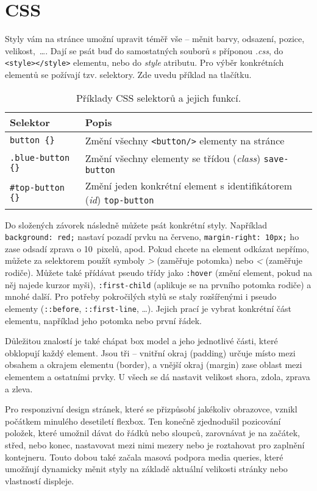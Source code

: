 \section{CSS}

Styly vám na stránce umožní upravit téměř vše – měnit barvy, odsazení, pozice,
\mbox{velikost},~\ldots. Dají se psát buď do samostatných souborů s příponou \textit{.css}, do \texttt{<style></style>} elementu, nebo do \textit{style} atributu. Pro výběr konkrétních elementů se požívají tzv. selektory. Zde uvedu příklad na tlačítku.

\begin{table}[h!]
\centering
\begin{tabular}{|>{\ttfamily}m{4cm}|m{8cm}|}
\hline
\textbf{Selektor} & \textbf{Popis} \\ \hline
\texttt{button \{\}} & Změní všechny \texttt{<button/>} elementy na stránce \\ \hline
\texttt{.blue-button \{\}} & Změní všechny elementy se třídou (\textit{class}) \texttt{save-button} \\ \hline
\texttt{\#top-button \{\}} & Změní jeden konkrétní element s identifikátorem (\textit{id}) \texttt{top-button} \\ \hline
\end{tabular}
\caption{Příklady CSS selektorů a jejich funkcí.}
\end{table}

Do složených závorek následně můžete psát konkrétní styly. Například \texttt{background:~red;} nastaví pozadí prvku na červeno, \texttt{margin-right:~10px;} ho zase odsadí zprava o 10~pixelů, apod. Pokud chcete na element odkázat nepřímo, můžete za selektorem použít symboly \textit{>} (zaměřuje potomka) nebo \textit{<} (zaměřuje rodiče). Můžete také přídávat pseudo třídy jako \texttt{:hover} (změní element, pokud na něj najede kurzor myši), \texttt{:first-child} (aplikuje se na prvního potomka rodiče) a mnohé další. Pro potřeby pokročilých stylů se staly rozšířenými i pseudo elementy (\texttt{::before}, \texttt{::first-line}, \ldots). Jejich prací je vybrat konkrétní část elementu, například jeho potomka nebo první řádek.

Důležitou znalostí je také chápat box model a jeho jednotlivé části, které obklopují každý element. Jsou tři – vnitřní okraj (padding) určuje místo mezi obsahem a okrajem elementu (border), a vnější okraj (margin) zase oblast mezi elementem a ostatními prvky. U všech se dá nastavit velikost shora, zdola, zprava a zleva.

Pro responzivní design stránek, které se přizpůsobí jakékoliv obrazovce, vznikl počátkem minulého desetiletí flexbox. Ten konečně zjednodušil pozicování položek, které umožnil dávat do řádků nebo sloupců, zarovnávat je na začátek, střed, nebo konec, nastavovat mezi nimi mezery nebo je roztahovat pro zaplnění kontejneru.\cite{CSSFlexbox} Touto dobou také začala masová podpora media queries, které umožňují dynamicky měnit styly na základě aktuální velikosti stránky nebo vlastností displeje.